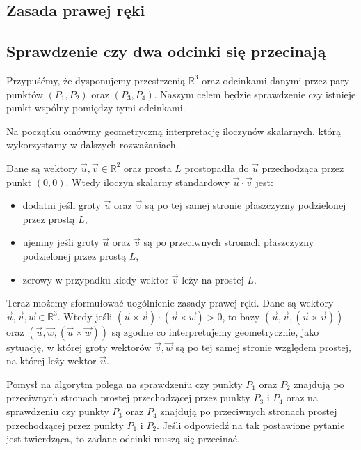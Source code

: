 \subsection{Zasada prawej ręki}

\subsection{Sprawdzenie czy dwa odcinki się przecinają}
Przypuśćmy, że dysponujemy przestrzenią $\mathbb{R}^3$ oraz odcinkami danymi przez pary punktów 
$(P_1, P_2)$ oraz $(P_3, P_4)$. Naszym celem będzie sprawdzenie
czy istnieje punkt wspólny pomiędzy tymi odcinkami.

Na początku omówmy geometryczną interpretację iloczynów skalarnych, którą wykorzystamy w dalszych rozważaniach.

Dane są wektory $\vec{u},\vec{v} \in \mathbb{R}^2$ oraz prosta $L$ prostopadła
do $\vec{u}$ przechodząca przez punkt $(0,0)$. Wtedy iloczyn skalarny 
standardowy $\vec{u} \cdot \vec{v}$
jest:
\begin{itemize}[]
	\item dodatni jeśli groty $\vec{u}$ oraz $\vec{v}$ są po tej samej stronie płaszczyzny podzielonej przez prostą $L$,
	\item ujemny jeśli groty $\vec{u}$ oraz $\vec{v}$ są po  przeciwnych stronach płaszczyzny podzielonej przez prostą $L$,
	\item zerowy w przypadku kiedy wektor $\vec{v}$
	leży na prostej $L$.
\end{itemize}

Teraz możemy sformułować uogólnienie zasady prawej ręki.
Dane są wektory $\vec{u},\vec{v},\vec{w} \in \mathbb{R}^3$.
Wtedy jeśli $(\vec{u} \times \vec{v})
\cdot (\vec{u} \times \vec{w}) > 0$, to bazy
$(\vec{u}, \vec{v},  (\vec{u} \times \vec{v}))$ oraz
$(\vec{u}, \vec{w},  (\vec{u} \times \vec{w}))$ są zgodne
co interpretujemy geometrycznie, jako sytuację, w której 
groty wektorów 
$\vec{v}, \vec{w}$ są po tej samej stronie względem prostej,
na której leży wektor $\vec{u}$.


Pomysł na algorytm polega na sprawdzeniu czy punkty $P_1$
oraz $P_2$ znajdują po przeciwnych stronach prostej 
przechodzącej przez punkty $P_3$ i $P_4$ oraz 
na sprawdzeniu czy punkty $P_3$
oraz $P_4$ znajdują po przeciwnych stronach prostej 
przechodzącej przez punkty $P_1$ i $P_2$. Jeśli odpowiedź
na tak postawione pytanie jest twierdząca, to zadane
odcinki muszą się przecinać.


